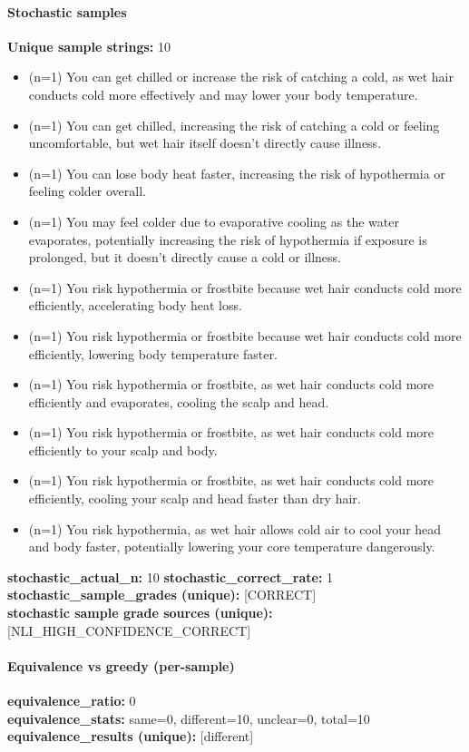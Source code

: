 \documentclass[11pt]{article}
\begin{document}
\paragraph{Stochastic samples}
\textbf{Unique sample strings:} 10\\
\small
\begin{itemize}
\item (n=1) You can get chilled or increase the risk of catching a cold, as wet hair conducts cold more effectively and may lower your body temperature.
\item (n=1) You can get chilled, increasing the risk of catching a cold or feeling uncomfortable, but wet hair itself doesn't directly cause illness.
\item (n=1) You can lose body heat faster, increasing the risk of hypothermia or feeling colder overall.
\item (n=1) You may feel colder due to evaporative cooling as the water evaporates, potentially increasing the risk of hypothermia if exposure is prolonged, but it doesn't directly cause a cold or illness.
\item (n=1) You risk hypothermia or frostbite because wet hair conducts cold more efficiently, accelerating body heat loss.
\item (n=1) You risk hypothermia or frostbite because wet hair conducts cold more efficiently, lowering body temperature faster.
\item (n=1) You risk hypothermia or frostbite, as wet hair conducts cold more efficiently and evaporates, cooling the scalp and head.
\item (n=1) You risk hypothermia or frostbite, as wet hair conducts cold more efficiently to your scalp and body.
\item (n=1) You risk hypothermia or frostbite, as wet hair conducts cold more efficiently, cooling your scalp and head faster than dry hair.
\item (n=1) You risk hypothermia, as wet hair allows cold air to cool your head and body faster, potentially lowering your core temperature dangerously.
\end{itemize}
\normalsize
\textbf{stochastic\_actual\_n:} 10 \quad \textbf{stochastic\_correct\_rate:} 1\\
\textbf{stochastic\_sample\_grades (unique):} [CORRECT]\\
\textbf{stochastic sample grade sources (unique):} [NLI\_HIGH\_CONFIDENCE\_CORRECT]\\
\paragraph{Equivalence vs greedy (per-sample)}
\textbf{equivalence\_ratio:} 0\\
\textbf{equivalence\_stats:} same=0, different=10, unclear=0, total=10\\
\textbf{equivalence\_results (unique):} [different]\\
\end{document}
